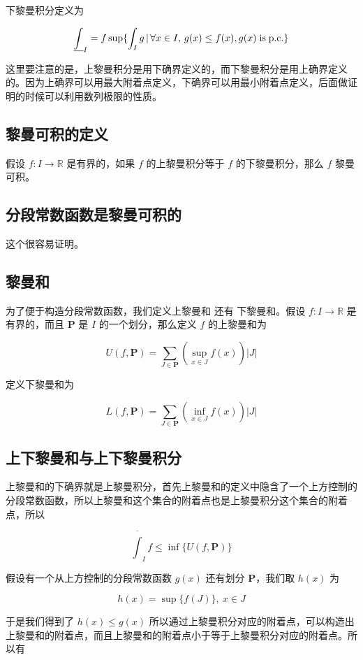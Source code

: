 下黎曼积分定义为

\[
    \underline{\int}_I = f\sup \{ \int_{I} g \,\vert\, \forall x \in I ,\, g(x) \le f(x), g(x) \mathrm{\; is\; p.c.} \}
\]

这里要注意的是，上黎曼积分是用下确界定义的，而下黎曼积分是用上确界定义的。因为上确界可以用最大附着点定义，下确界可以用最小附着点定义，后面做证明的时候可以利用数列极限的性质。


\subsection{黎曼可积的定义}

假设 $f: I \to \mathbb{R}$ 是有界的，如果 $f$ 的上黎曼积分等于 $f$ 的下黎曼积分，那么 $f$ 黎曼可积。


\subsection{分段常数函数是黎曼可积的}

这个很容易证明。


\subsection{黎曼和}

为了便于构造分段常数函数，我们定义上黎曼和 还有 下黎曼和。假设 $f: I \to \mathbb{R}$ 是有界的，而且 $\mathbf{P}$ 是 $I$ 的一个划分，那么定义 $f$ 的上黎曼和为

\[
    U(f, \mathbf{P}) = \sum_{J \in \mathbf{P}} (\sup_{x \in J}f(x)) \lvert J \rvert
\]

定义下黎曼和为

\[
    L(f, \mathbf{P}) = \sum_{J \in \mathbf{P}} (\inf_{x \in J}f(x)) \lvert J \rvert
\]

\subsection{上下黎曼和与上下黎曼积分}

上黎曼和的下确界就是上黎曼积分，首先上黎曼和的定义中隐含了一个上方控制的分段常数函数，所以上黎曼和这个集合的附着点也是上黎曼积分这个集合的附着点，所以

\[
    \overline{\int}_I f \le \inf \{ U(f, \mathbf{P}) \}
\]

假设有一个从上方控制的分段常数函数 $g(x)$ 还有划分 $\mathbf{P}$，我们取 $h(x)$ 为

\[
    h(x) = \sup \{ f(J) \}, \: x \in J
\]

于是我们得到了 $h(x) \le g(x)$ 所以通过上黎曼积分对应的附着点，可以构造出上黎曼和的附着点，而且上黎曼和的附着点小于等于上黎曼积分对应的附着点。所以有

